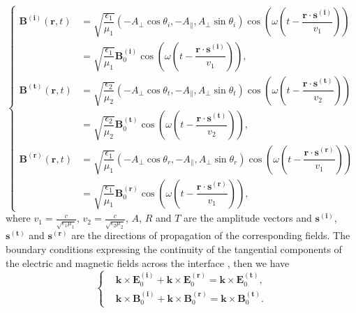 \documentclass[a4paper,12pt,]{article}
\numberwithin{equation}{section}
\numberwithin{equation}{section} \allowdisplaybreaks
\begin{document}
\begin{equation*}
  \begin{cases}
    \mathbf{B}^{(\mathbf{i})}(\mathbf{r},t) & = \sqrt{\dfrac{\epsilon_{1}}{\mu_{1}}}(-A_{\bot}\cos\theta_{i} , -A_{\parallel} , A_{\bot}\sin\theta_{i}) \cos(\omega(t - \dfrac{\mathbf{r} \cdot \mathbf{s^{(i)}}}{v_{1}})) \\
    & =  \sqrt{\dfrac{\epsilon_{1}}{\mu_{1}}} \mathbf{B}_{0}^{(\mathbf{i})} \cos(\omega(t - \dfrac{\mathbf{r} \cdot \mathbf{s^{(i)}}}{v_{1}})), \\
    \mathbf{B}^{(\mathbf{t})}(\mathbf{r},t) & = \sqrt{\dfrac{\epsilon_{2}}{\mu_{2}}}(-A_{\bot}\cos\theta_{t} , -A_{\parallel} , A_{\bot}\sin\theta_{t}) \cos(\omega(t - \dfrac{\mathbf{r} \cdot \mathbf{s^{(t)}}}{v_{2}})) \\
    & =  \sqrt{\dfrac{\epsilon_{2}}{\mu_{2}}} \mathbf{B}_{0}^{(\mathbf{t})} \cos(\omega(t - \dfrac{\mathbf{r} \cdot \mathbf{s^{(t)}}}{v_{2}})), \\
    \mathbf{B}^{(\mathbf{r})}(\mathbf{r},t) & = \sqrt{\dfrac{\epsilon_{1}}{\mu_{1}}}(-A_{\bot}\cos\theta_{r} , -A_{\parallel} , A_{\bot}\sin\theta_{r}) \cos(\omega(t - \dfrac{\mathbf{r} \cdot \mathbf{s^{(r)}}}{v_{1}}))  \\
    & =  \sqrt{\dfrac{\epsilon_{1}}{\mu_{1}}} \mathbf{B}_{0}^{(\mathbf{r})} \cos(\omega(t - \dfrac{\mathbf{r} \cdot \mathbf{s^{(r)}}}{v_{1}})),
  \end{cases}
\end{equation*}
where $v_{1} = \displaystyle \frac{c}{\sqrt{\epsilon_{1} \mu_{1}}}$, $v_{2} = \displaystyle \frac{c}{\sqrt{\epsilon_{2} \mu_{2}}}$, $A$, $R$ and $T$ are the amplitude vectors and $\mathbf{s}^{(\mathbf{i})}$, $\mathbf{s}^{(\mathbf{t})}$ and $\mathbf{s}^{(\mathbf{r})}$ are the directions of propagation of the corresponding fields. The boundary conditions expressing the continuity of the tangential components of the electric and magnetic fields across the interface \cite{BW13}, then we have
\begin{equation}\label{2.12}
  \left\{
  \begin{split}
       & \mathbf{k} \times \mathbf{E}^{(\mathbf{i})}_{0} + \mathbf{k} \times \mathbf{E}^{(\mathbf{r})}_{0} =  \mathbf{k} \times \mathbf{E}^{(\mathbf{t})}_{0},  \\
       & \mathbf{k} \times \mathbf{B}^{(\mathbf{i})}_{0} + \mathbf{k} \times \mathbf{B}^{(\mathbf{r})}_{0} = \mathbf{k} \times \mathbf{B}^{(\mathbf{t})}_{0}.
  \end{split}
  \right.
\end{equation}
\end{document}
